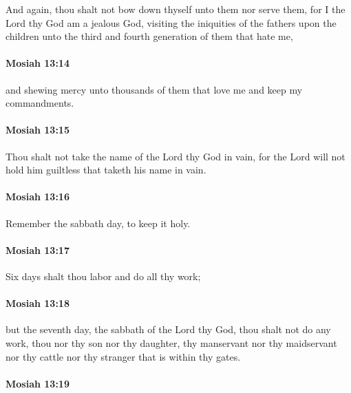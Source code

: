 			And again, thou shalt not bow down thyself unto them nor serve them,
			for I the Lord thy God am a jealous God,
			visiting the iniquities of the fathers upon the children
			unto the third and fourth generation of them that hate me,

		\paragraph{Mosiah 13:14} %
			\label{MOSIAH-13-14}

			and shewing mercy unto thousands of them
			that love me and keep my commandments.

		\paragraph{Mosiah 13:15} %
			\label{MOSIAH-13-15}

			Thou shalt not take the name of the Lord thy God in vain,
			for the Lord will not hold him guiltless that taketh his name in vain.

		\paragraph{Mosiah 13:16} %
			\label{MOSIAH-13-16}

			Remember the sabbath day, to keep it holy.

		\paragraph{Mosiah 13:17} %
			\label{MOSIAH-13-17}

			Six days shalt thou labor and do all thy work;

		\paragraph{Mosiah 13:18} %
			\label{MOSIAH-13-18}

			but the seventh day, the sabbath of the Lord thy God,
			thou shalt not do any work, thou nor thy son nor thy daughter,
			thy manservant nor thy maidservant nor thy cattle
			nor thy stranger that is within thy gates.

		\paragraph{Mosiah 13:19} %
			\label{MOSIAH-13-19}

